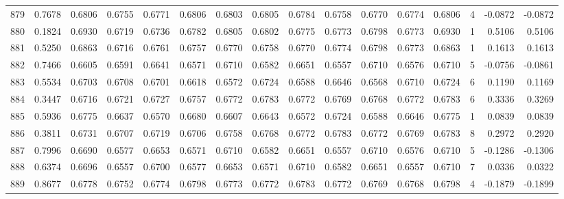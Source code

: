 \begin{tabular}{lrrrrrrrrrrrrrrr}
879 &      0.7678 &  0.6806 &  0.6755 &  0.6771 &  0.6806 &  0.6803 &  0.6805 &  0.6784 &  0.6758 &  0.6770 &   0.6774 &     0.6806 &      4 &                   -0.0872 &                    -0.0872 \\
880 &      0.1824 &  0.6930 &  0.6719 &  0.6736 &  0.6782 &  0.6805 &  0.6802 &  0.6775 &  0.6773 &  0.6798 &   0.6773 &     0.6930 &      1 &                    0.5106 &                     0.5106 \\
881 &      0.5250 &  0.6863 &  0.6716 &  0.6761 &  0.6757 &  0.6770 &  0.6758 &  0.6770 &  0.6774 &  0.6798 &   0.6773 &     0.6863 &      1 &                    0.1613 &                     0.1613 \\
882 &      0.7466 &  0.6605 &  0.6591 &  0.6641 &  0.6571 &  0.6710 &  0.6582 &  0.6651 &  0.6557 &  0.6710 &   0.6576 &     0.6710 &      5 &                   -0.0756 &                    -0.0861 \\
883 &      0.5534 &  0.6703 &  0.6708 &  0.6701 &  0.6618 &  0.6572 &  0.6724 &  0.6588 &  0.6646 &  0.6568 &   0.6710 &     0.6724 &      6 &                    0.1190 &                     0.1169 \\
884 &      0.3447 &  0.6716 &  0.6721 &  0.6727 &  0.6757 &  0.6772 &  0.6783 &  0.6772 &  0.6769 &  0.6768 &   0.6772 &     0.6783 &      6 &                    0.3336 &                     0.3269 \\
885 &      0.5936 &  0.6775 &  0.6637 &  0.6570 &  0.6680 &  0.6607 &  0.6643 &  0.6572 &  0.6724 &  0.6588 &   0.6646 &     0.6775 &      1 &                    0.0839 &                     0.0839 \\
886 &      0.3811 &  0.6731 &  0.6707 &  0.6719 &  0.6706 &  0.6758 &  0.6768 &  0.6772 &  0.6783 &  0.6772 &   0.6769 &     0.6783 &      8 &                    0.2972 &                     0.2920 \\
887 &      0.7996 &  0.6690 &  0.6577 &  0.6653 &  0.6571 &  0.6710 &  0.6582 &  0.6651 &  0.6557 &  0.6710 &   0.6576 &     0.6710 &      5 &                   -0.1286 &                    -0.1306 \\
888 &      0.6374 &  0.6696 &  0.6557 &  0.6700 &  0.6577 &  0.6653 &  0.6571 &  0.6710 &  0.6582 &  0.6651 &   0.6557 &     0.6710 &      7 &                    0.0336 &                     0.0322 \\
889 &      0.8677 &  0.6778 &  0.6752 &  0.6774 &  0.6798 &  0.6773 &  0.6772 &  0.6783 &  0.6772 &  0.6769 &   0.6768 &     0.6798 &      4 &                   -0.1879 &                    -0.1899 \\

\end{tabular}
